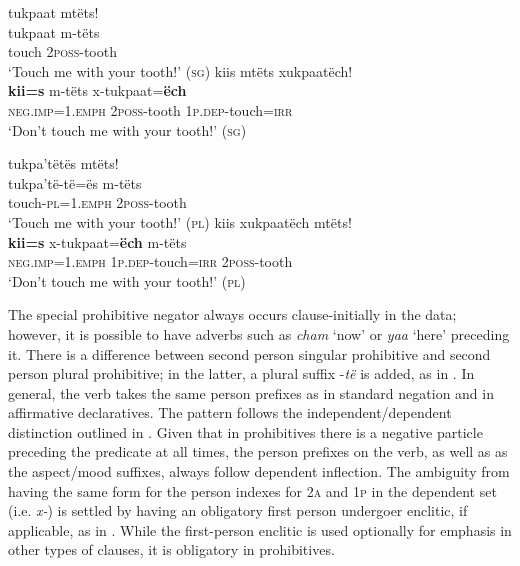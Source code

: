 \documentclass[output=paper,colorlinks,citecolor=brown,draft]{langscibook}
\begin{document}
\ea\label{ex:mix:23}
    \ea\label{ex:mix:23a}
        \glll  tukpaat mtëts!\\
              tukpaat m-tëts \\
              touch \textsc{2poss}-tooth \\
        \glt ‘Touch me with your tooth!’ (\textsc{sg})
    \ex\label{ex:mix:23b}
        \glll kiis mtëts xukpaatëch! \\ 
              \textbf{kii=s} m-tëts x-tukpaat=\textbf{ëch} \\
              \textsc{neg.imp}=1.\textsc{emph} \textsc{2poss}-tooth \textsc{1p.dep}-touch=\textsc{irr}\\
        \glt ‘Don’t touch me with your tooth!’ (\textsc{sg})
    \z
\z 

\ea\label{ex:mix:24}
    \ea\label{ex:mix:24a}
        \glll tukpa’tëtës mtëts!\\
              tukpa’të-të=ës m-tëts\\
              touch-\textsc{pl=}1.\textsc{emph} \textsc{2poss}{}-tooth\\
        \glt ‘Touch me with your tooth!’ (\textsc{pl})
    \ex\label{ex:mix:24b}
        \glll kiis xukpaatëch mtëts! \\ 
              \textbf{kii=s} x-tukpaat=\textbf{ëch} m-tëts \\
              \textsc{neg.imp}=1.\textsc{emph} \textsc{1p.dep-}touch=\textsc{irr} \textsc{2poss}{}-tooth\\
        \glt ‘Don’t touch me with your tooth!’ (\textsc{pl}) 
    \z
\z 

The special prohibitive negator always occurs clause-initially in the data; however, it is possible to have adverbs such as \textit{cham} ‘now’ or \textit{yaa} ‘here’ preceding it. There is a difference between second person singular prohibitive and second person plural prohibitive; in the latter, a plural suffix -\textit{të} is added, as in . In general, the verb takes the same person prefixes as in standard negation and in affirmative declaratives. The pattern follows the independent/dependent distinction outlined in . Given that in prohibitives there is a negative particle preceding the predicate at all times, the person prefixes on the verb, as well as as the aspect/mood suffixes, always follow dependent inflection. The ambiguity from having the same form for the person indexes for 2\textsc{a} and 1\textsc{p} in the dependent set (i.e. \textit{x-}) is settled by having an obligatory first person undergoer enclitic, if applicable, as in . While the first-person enclitic is used optionally for emphasis in other types of clauses, it is obligatory in prohibitives.
\end{document}
